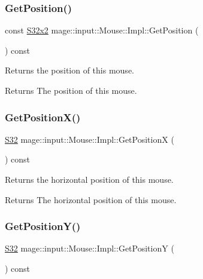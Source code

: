 \subsubsection{\texorpdfstring{Get\+Position()}{GetPosition()}}
{\footnotesize\ttfamily const \mbox{\hyperlink{namespacemage_a4843c424aae7bb5fb6c440ed6ed593ee}{S32x2}} mage\+::input\+::\+Mouse\+::\+Impl\+::\+Get\+Position (\begin{DoxyParamCaption}{ }\end{DoxyParamCaption}) const\hspace{0.3cm}{\ttfamily [noexcept]}}

Returns the position of this mouse.

\begin{DoxyReturn}{Returns}
The position of this mouse. 
\end{DoxyReturn}
\mbox{\label{classmage_1_1input_1_1_mouse_1_1_impl_a3446d3bd42aa376e1c3d877cf24a232b}} 
\subsubsection{\texorpdfstring{Get\+Position\+X()}{GetPositionX()}}
{\footnotesize\ttfamily \mbox{\hyperlink{namespacemage_a642e05c5c83642b6946703615cdbf2da}{S32}} mage\+::input\+::\+Mouse\+::\+Impl\+::\+Get\+PositionX (\begin{DoxyParamCaption}{ }\end{DoxyParamCaption}) const\hspace{0.3cm}{\ttfamily [noexcept]}}

Returns the horizontal position of this mouse.

\begin{DoxyReturn}{Returns}
The horizontal position of this mouse. 
\end{DoxyReturn}
\mbox{\label{classmage_1_1input_1_1_mouse_1_1_impl_a5c03e19ff1a384aa6fd9ae5d7c603c9a}} 
\subsubsection{\texorpdfstring{Get\+Position\+Y()}{GetPositionY()}}
{\footnotesize\ttfamily \mbox{\hyperlink{namespacemage_a642e05c5c83642b6946703615cdbf2da}{S32}} mage\+::input\+::\+Mouse\+::\+Impl\+::\+Get\+PositionY (\begin{DoxyParamCaption}{ }\end{DoxyParamCaption}) const\hspace{0.3cm}{\ttfamily [noexcept]}}

